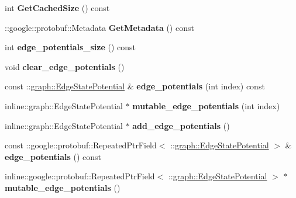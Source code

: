 \begin{DoxyCompactItemize}
\item 
\hypertarget{classgraph_1_1MRFEdge_a2b59a32ff130f0764e937f043fd03778}{
int {\bfseries GetCachedSize} () const }
\label{classgraph_1_1MRFEdge_a2b59a32ff130f0764e937f043fd03778}

\item 
\hypertarget{classgraph_1_1MRFEdge_a2f9380861d525a638a503a73461bd185}{
::google::protobuf::Metadata {\bfseries GetMetadata} () const }
\label{classgraph_1_1MRFEdge_a2f9380861d525a638a503a73461bd185}

\item 
\hypertarget{classgraph_1_1MRFEdge_ae838e1baabe8852d5ec775f0284ba8b7}{
int {\bfseries edge\_\-potentials\_\-size} () const }
\label{classgraph_1_1MRFEdge_ae838e1baabe8852d5ec775f0284ba8b7}

\item 
\hypertarget{classgraph_1_1MRFEdge_a53d239c44edb18262f0a3c13fd88fb03}{
void {\bfseries clear\_\-edge\_\-potentials} ()}
\label{classgraph_1_1MRFEdge_a53d239c44edb18262f0a3c13fd88fb03}

\item 
\hypertarget{classgraph_1_1MRFEdge_a8dfe87119ec061fe429f4613dd23b1ad}{
const ::\hyperlink{classgraph_1_1EdgeStatePotential}{graph::EdgeStatePotential} \& {\bfseries edge\_\-potentials} (int index) const }
\label{classgraph_1_1MRFEdge_a8dfe87119ec061fe429f4613dd23b1ad}

\item 
\hypertarget{classgraph_1_1MRFEdge_aeff746d072366c703b082307e958d2f0}{
inline::graph::EdgeStatePotential $\ast$ {\bfseries mutable\_\-edge\_\-potentials} (int index)}
\label{classgraph_1_1MRFEdge_aeff746d072366c703b082307e958d2f0}

\item 
\hypertarget{classgraph_1_1MRFEdge_a41a3d93e349503b5d3e24bdc21044810}{
inline::graph::EdgeStatePotential $\ast$ {\bfseries add\_\-edge\_\-potentials} ()}
\label{classgraph_1_1MRFEdge_a41a3d93e349503b5d3e24bdc21044810}

\item 
\hypertarget{classgraph_1_1MRFEdge_a9429ca0ab408685e9d2a955366f50ed6}{
const ::google::protobuf::RepeatedPtrField$<$ ::\hyperlink{classgraph_1_1EdgeStatePotential}{graph::EdgeStatePotential} $>$ \& {\bfseries edge\_\-potentials} () const }
\label{classgraph_1_1MRFEdge_a9429ca0ab408685e9d2a955366f50ed6}

\item 
\hypertarget{classgraph_1_1MRFEdge_a5f8f28def741a8d3476c36eeab872547}{
inline::google::protobuf::RepeatedPtrField$<$ ::\hyperlink{classgraph_1_1EdgeStatePotential}{graph::EdgeStatePotential} $>$ $\ast$ {\bfseries mutable\_\-edge\_\-potentials} ()}
\label{classgraph_1_1MRFEdge_a5f8f28def741a8d3476c36eeab872547}


\end{DoxyCompactItemize}
